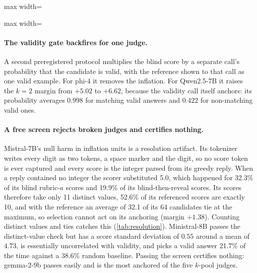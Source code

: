 \begin{table}[htbp]
\centering
\caption{Reveal-call variants: added inflation over blind (\sd, 95\% CI), 58 tasks.\pre}
\label{tab:m1variants}
\footnotesize
\setlength{\tabcolsep}{3pt}
\begin{adjustbox}{max width=\linewidth}\end{adjustbox}

\end{table}

\begin{table}[htbp]
\centering
\caption{Reveal-call variants: change in selection accuracy relative to blind, in points (95\% CI), 39 $k$-pool tasks at $k{>}1$.\ph}
\label{tab:acc-variants}
\footnotesize
\setlength{\tabcolsep}{3pt}
\begin{adjustbox}{max width=\linewidth}\end{adjustbox}

\end{table}

\paragraph{The validity gate backfires for one judge.}
A second preregistered protocol multiplies the blind score by a separate call's probability that the candidate is valid, with the reference shown to that call as one valid example. For phi-4 it removes the inflation. For Qwen2.5-7B it raises the $k{=}2$ margin from $+5.02$ to $+6.62$, because the validity call itself anchors: its probability averages $0.998$ for matching valid answers and $0.422$ for non-matching valid ones.

\paragraph{A free screen rejects broken judges and certifies nothing.}
Mistral-7B's null harm in inflation units is a resolution artifact. Its tokenizer writes every digit as two tokens, a space marker and the digit, so no score token is ever captured and every score is the integer parsed from its greedy reply. When a reply contained no integer the scorer substituted 5.0, which happened for 32.3\% of its blind rubric-$a$ scores and 19.9\% of its blind-then-reveal scores. Its scores therefore take only 11 distinct values, 52.6\% of its referenced scores are exactly 10, and with the reference an average of 32.1 of its 64 candidates tie at the maximum, so selection cannot act on its anchoring (margin $+1.38$). Counting distinct values and ties catches this (\cref{tab:resolution}). Ministral-8B passes the distinct-value check but has a score standard deviation of $0.55$ around a mean of $4.73$, is essentially uncorrelated with validity, and picks a valid answer 21.7\% of the time against a 38.6\% random baseline. Passing the screen certifies nothing: gemma-2-9b passes easily and is the most anchored of the five $k$-pool judges.

